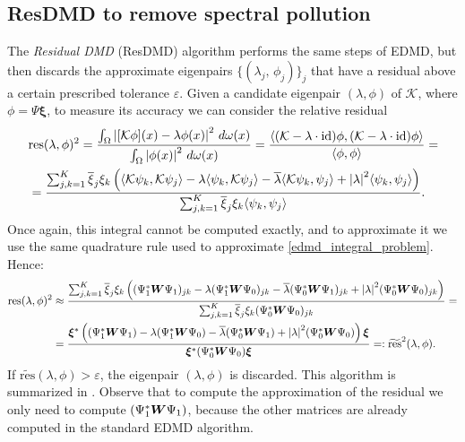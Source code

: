 \subsection{ResDMD to remove spectral pollution}
The \emph{Residual DMD} (ResDMD) algorithm performs the same steps of EDMD, but then discards the approximate eigenpairs $\{(\lambda_j,\, \phi_j)\}_j$ that have a residual above a certain prescribed tolerance $\varepsilon$. Given a candidate eigenpair $(\lambda, \phi)$ of $\mathcal{K}$, where $\phi = \Psi\bm{\xi}$, to measure its accuracy we can consider the relative residual
\begin{equation}
    \label{residual_definiton}
    \begin{split}
        &\mathrm{res}(\lambda, \phi)^2 = \frac{\int_{\Omega} \abs{[\mathcal{K}\phi](x) - \lambda\phi(x)}^2\,\,d\omega(x)}{\int_{\Omega} \abs{\phi(x)}^2\,\,d\omega(x)} 
        = \frac{\langle (\mathcal{K} - \lambda \cdot\mathrm{id})\phi, (\mathcal{K} - \lambda \cdot \mathrm{id})\phi \rangle}{\langle\phi , \phi \rangle} = \\
        & = \frac{\sum_{j,k = 1}^K \overline{\xi}_j\xi_k \left( \langle\mathcal{K}\psi_k, \mathcal{K}\psi_j\rangle - \lambda \langle\psi_k, \mathcal{K}\psi_j\rangle - \overline{\lambda}\langle\mathcal{K}\psi_k, \psi_j\rangle + \abs{\lambda}^2 \langle\psi_k, \psi_j\rangle\right)}{\sum_{j,k = 1}^K \overline{\xi}_j\xi_k \langle\psi_k, \psi_j\rangle}.
    \end{split}
\end{equation}
Once again, this integral cannot be computed exactly, and to approximate it we use the same quadrature rule used to approximate \eqref{edmd_integral_problem}. Hence:
\begin{equation}
    \label{residual_approx}
    \begin{split}
        \mathrm{res}(\lambda, \phi)^2 &\approx \frac{\sum_{j,k = 1}^K \overline{\xi}_j\xi_k \left( (\Psi_1^*\vb*{W}\Psi_1)_{jk} - \lambda (\Psi_1^*\vb*{W}\Psi_0)_{jk} - \overline{\lambda}(\Psi_0^*\vb*{W}\Psi_1)_{jk} + \abs{\lambda}^2 (\Psi_0^*\vb*{W}\Psi_0)_{jk}\right)}{\sum_{j,k = 1}^K \overline{\xi}_j\xi_k (\Psi_0^*\vb*{W}\Psi_0)_{jk}} = \\ 
        & = \frac{\bm{\xi}^* \left((\Psi_1^*\vb*{W}\Psi_1) - \lambda (\Psi_1^*\vb*{W}\Psi_0) - \overline{\lambda}(\Psi_0^*\vb*{W}\Psi_1) + \abs{\lambda}^2 (\Psi_0^*\vb*{W}\Psi_0)\right) \bm{\xi}}{\bm{\xi}^*(\Psi_0^*\vb*{W}\Psi_0)\bm{\xi}} =: \widetilde{\mathrm{res}}^2(\lambda, \phi).
    \end{split}
\end{equation}
If $\widetilde{\mathrm{res}}(\lambda, \phi) > \varepsilon$, the eigenpair $(\lambda, \phi)$ is discarded. This algorithm is summarized in . Observe that to compute the approximation of the residual we only need to compute $(\Psi_1^*\vb*{W}\Psi_1)$, because the other matrices are already computed in the standard EDMD algorithm. 

